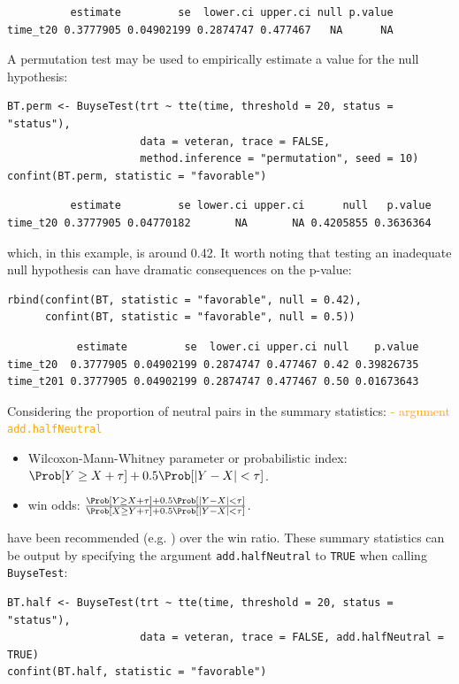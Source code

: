 \documentclass[12pt]{article}
\begin{document}
\begin{verbatim}
          estimate         se  lower.ci upper.ci null p.value
time_t20 0.3777905 0.04902199 0.2874747 0.477467   NA      NA
\end{verbatim}


A permutation test may be used to empirically estimate a value for the
null hypothesis:
\lstset{language=r,label= ,caption= ,captionpos=b,numbers=none}
\begin{lstlisting}
BT.perm <- BuyseTest(trt ~ tte(time, threshold = 20, status = "status"),
                     data = veteran, trace = FALSE,
                     method.inference = "permutation", seed = 10)
confint(BT.perm, statistic = "favorable")
\end{lstlisting}

\begin{verbatim}
          estimate         se lower.ci upper.ci      null   p.value
time_t20 0.3777905 0.04770182       NA       NA 0.4205855 0.3636364
\end{verbatim}


which, in this example, is around 0.42. It worth noting that testing
an inadequate null hypothesis can have dramatic consequences on the
p-value:
\lstset{language=r,label= ,caption= ,captionpos=b,numbers=none}
\begin{lstlisting}
rbind(confint(BT, statistic = "favorable", null = 0.42),
      confint(BT, statistic = "favorable", null = 0.5))
\end{lstlisting}

\begin{verbatim}
           estimate         se  lower.ci upper.ci null    p.value
time_t20  0.3777905 0.04902199 0.2874747 0.477467 0.42 0.39826735
time_t201 0.3777905 0.04902199 0.2874747 0.477467 0.50 0.01673643
\end{verbatim}


\clearpage

\noindent Considering the proportion of neutral pairs in the summary
statistics: \hfill \textcolor{orange}{- argument \texttt{add.halfNeutral}}
\begin{itemize}
\item Wilcoxon-Mann-Whitney parameter or probabilistic index: \(\Prob[Y\geq X + \tau] + 0.5 \Prob[|Y- X| < \tau]\).
\item win odds: \(\frac{\Prob[Y\geq X + \tau] + 0.5 \Prob[|Y- X| < \tau]}{\Prob[X\geq Y + \tau] + 0.5 \Prob[|Y- X| < \tau]}\).
\end{itemize}
have been recommended (e.g. \cite{ajufo2023fallacies}) over the win
ratio. These summary statistics can be output by specifying the
argument \texttt{add.halfNeutral} to \texttt{TRUE} when calling \texttt{BuyseTest}:
\lstset{language=r,label= ,caption= ,captionpos=b,numbers=none}
\begin{lstlisting}
BT.half <- BuyseTest(trt ~ tte(time, threshold = 20, status = "status"),
                     data = veteran, trace = FALSE, add.halfNeutral = TRUE)
confint(BT.half, statistic = "favorable")
\end{lstlisting}
\end{document}
